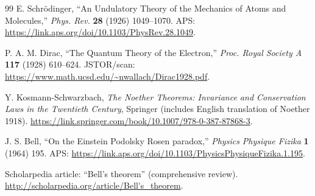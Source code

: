 \documentclass[11pt]{article}
\begin{document}
\begin{thebibliography}{99}
 E. Schr\"odinger, ``An Undulatory Theory of the Mechanics of Atoms and Molecules,'' \textit{Phys. Rev.} \textbf{28} (1926) 1049–1070. APS: \url{https://link.aps.org/doi/10.1103/PhysRev.28.1049}.

 P. A. M. Dirac, ``The Quantum Theory of the Electron,'' \textit{Proc. Royal Society A} \textbf{117} (1928) 610–624. JSTOR/scan: \url{https://www.math.ucsd.edu/~nwallach/Dirac1928.pdf}.

 Y. Kosmann-Schwarzbach, \textit{The Noether Theorems: Invariance and Conservation Laws in the Twentieth Century}, Springer (includes English translation of Noether 1918). \url{https://link.springer.com/book/10.1007/978-0-387-87868-3}.

 J. S. Bell, ``On the Einstein Podolsky Rosen paradox,'' \textit{Physics Physique Fizika} \textbf{1} (1964) 195. APS: \url{https://link.aps.org/doi/10.1103/PhysicsPhysiqueFizika.1.195}.

 Scholarpedia article: ``Bell’s theorem'' (comprehensive review). \url{http://scholarpedia.org/article/Bell's_theorem}.
\end{thebibliography}
\end{document}
